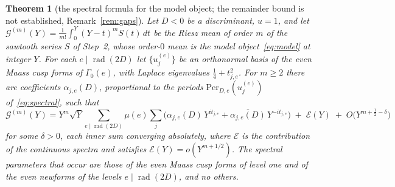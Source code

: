 \documentclass[11pt,a4paper]{article}
\newtheorem{theorem}{Theorem}
\theoremstyle{remark}\newtheorem{remark}[theorem]{Remark}
\begin{document}
\begin{theorem}[the spectral formula for the model object; the remainder bound is not established, Remark~\ref{rem:gaps}]\label{thm:main}
Let $D<0$ be a discriminant, $u=1$, and let $\mathcal G^{(m)}(Y)=\frac1{m!}\int_0^Y(Y-t)^mS(t)\,dt$ be the Riesz mean of order $m$ of the
sawtooth series $S$ of Step~2, whose order-$0$ mean is the model object~\eqref{eq:model} at integer $Y$. For each $e\mid\operatorname{rad}(2D)$ let $\{u^{(e)}_j\}$ be an orthonormal basis of the even
Maass cusp forms of $\Gamma_0(e)$, with Laplace eigenvalues $\tfrac14+t_{j,e}^2$. For $m\ge2$ there are coefficients
$\alpha_{j,e}(D)$, proportional to the periods $\mathrm{Per}_{D,e}(u^{(e)}_j)$ of~\eqref{eq:spectral}, such that
\[
\mathcal G^{(m)}(Y)=Y^{m}\sqrt Y\sum_{e\mid\operatorname{rad}(2D)}\mu(e)\sum_{j}\bigl(\alpha_{j,e}(D)\,Y^{it_{j,e}}+\overline{\alpha_{j,e}(D)}\,Y^{-it_{j,e}}\bigr)
\;+\;\mathcal E(Y)\;+\;O\bigl(Y^{m+\frac12-\delta}\bigr)
\]
for some $\delta>0$, each inner sum converging absolutely, where $\mathcal E$ is the contribution of the continuous
spectra and satisfies $\mathcal E(Y)=o(Y^{m+1/2})$. The spectral parameters that occur are those of the even Maass cusp
forms of level one and of the even newforms of the levels $e\mid\operatorname{rad}(2D)$, and no others.
\end{theorem}
\end{document}
